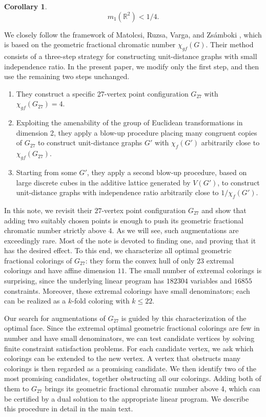 \documentclass[pdflatex,sn-mathphys-num]{sn-jnl}%
\newtheorem{corollary}{Corollary}
\newcommand{\G}{G_{27}}
\begin{document}
\begin{corollary}
\[
    m_1(\mathbb{R}^2) < 1/4.
\]
\end{corollary}

We closely follow the framework of Matolcsi, Ruzsa, Varga, and Zsámboki \cite{MRVZ}, which is based on the geometric fractional chromatic number $\chi_{gf}(G)$. Their method consists of a three-step strategy for constructing unit-distance graphs with small independence ratio. In the present paper, we modify only the first step, and then use the remaining two steps unchanged.

\begin{enumerate}
    \item They construct a specific 27-vertex point configuration $G_{27}$ with $\chi_{gf}(G_{27}) = 4$.
    \item Exploiting the amenability of the group of Euclidean transformations in dimension 2, they apply a blow-up procedure placing many congruent copies of $\G$ to construct unit-distance graphs $G'$ with $\chi_f(G')$ arbitrarily close to $\chi_{gf}(\G)$.
    \item Starting from some $G'$, they apply a second blow-up procedure, based on large discrete cubes in the additive lattice generated by $V(G')$, to construct unit-distance graphs with independence ratio arbitrarily close to $1/\chi_f(G')$.
\end{enumerate}

In this note, we revisit their $27$-vertex point configuration $G_{27}$ and show that adding two suitably chosen points is enough to push its geometric fractional chromatic number strictly above $4$. As we will see, such augmentations are exceedingly rare. Most of the note is devoted to finding one, and proving that it has the desired effect. To this end, we characterize all optimal geometric fractional colorings of $G_{27}$: they form the convex hull of only $23$ extremal colorings and have affine dimension $11$. The small number of extremal colorings is surprising, since the underlying linear program has $182304$ variables and $16855$ constraints. Moreover, these extremal colorings have small denominators; each can be realized as a $k$-fold coloring with $k\le 22$. 

Our search for augmentations of $G_{27}$ is guided by this characterization of the optimal face. Since the extremal optimal geometric fractional colorings are few in number and have small denominators, we can test candidate vertices by solving finite constraint satisfaction problems. For each candidate vertex, we ask which colorings can be extended to the new vertex. A vertex that obstructs many colorings is then regarded as a promising candidate. We then identify two of the most promising candidates, together obstructing all our colorings. Adding both of them to $G_{27}$ brings its geometric fractional chromatic number above 4, which can be certified by a dual solution to the appropriate linear program. We describe this procedure in detail in the main text. 
\end{document}
